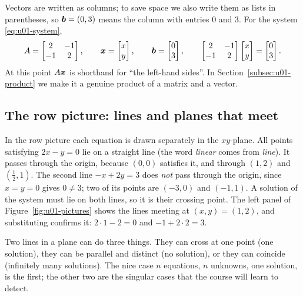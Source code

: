 Vectors are written as columns; to save space we also write them as lists in parentheses,
so $\boldsymbol{b}=(0,3)$ means the column with entries $0$ and $3$. For the system
\eqref{eq:u01-system},
\[
  A=\begin{bmatrix} 2 & -1\\ -1 & 2\end{bmatrix},\qquad
  \boldsymbol{x}=\begin{bmatrix} x\\ y\end{bmatrix},\qquad
  \boldsymbol{b}=\begin{bmatrix} 0\\ 3\end{bmatrix},\qquad
  \begin{bmatrix} 2 & -1\\ -1 & 2\end{bmatrix}\begin{bmatrix} x\\ y\end{bmatrix}
  =\begin{bmatrix} 0\\ 3\end{bmatrix}.
\]
At this point $A\boldsymbol{x}$ is shorthand for ``the left-hand sides''. In
Section~\ref{subsec:u01-product} we make it a genuine product of a matrix and a vector.

\subsection{The row picture: lines and planes that meet}

In the row picture each equation is drawn separately in the $xy$-plane. All points
satisfying $2x-y=0$ lie on a straight line (the word \emph{linear} comes from \emph{line}).
It passes through the origin, because $(0,0)$ satisfies it, and through $(1,2)$ and
$(\tfrac12,1)$. The second line $-x+2y=3$ does \emph{not} pass through the origin, since
$x=y=0$ gives $0\neq 3$; two of its points are $(-3,0)$ and $(-1,1)$. A solution of the
system must lie on both lines, so it is their crossing point. The left panel of
Figure~\ref{fig:u01-pictures} shows the lines meeting at $(x,y)=(1,2)$, and substituting
confirms it: $2\cdot1-2=0$ and $-1+2\cdot2=3$.

Two lines in a plane can do three things. They can cross at one point (one solution), they
can be parallel and distinct (no solution), or they can coincide (infinitely many solutions).
The nice case $n$ equations, $n$ unknowns, one solution, is the first; the other two are the
singular cases that the course will learn to detect.

